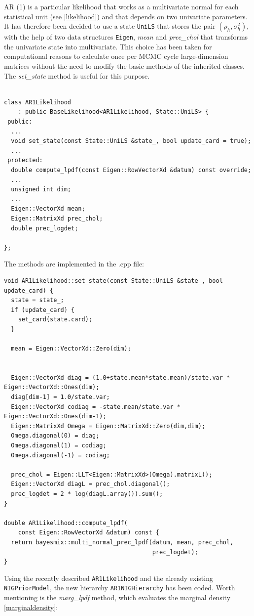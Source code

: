 \documentclass[12pt,a4paper]{article}
\begin{document}
AR (1) is a particular likelihood that works as a multivariate normal for each statistical unit (see \autoref{likelihood}) and that depends on two univariate parameters. It has therefore been decided to use a state \texttt{UniLS} that stores the pair $(\rho_h, \sigma_h^2)$, with the help of two data structures \texttt{Eigen}, \textit{mean} and \textit{prec\_chol} that transforms the univariate state into multivariate. This choice has been taken for computational reasons to calculate once per MCMC cycle large-dimension matrices without the need to modify the basic methods of the inherited classes. The \textit{set\_state} method is useful for this purpose.
\begin{lstlisting} 

class AR1Likelihood
    : public BaseLikelihood<AR1Likelihood, State::UniLS> {
 public:
  ...
  void set_state(const State::UniLS &state_, bool update_card = true);
  ...
 protected:
  double compute_lpdf(const Eigen::RowVectorXd &datum) const override;
  ...
  unsigned int dim;
  ...
  Eigen::VectorXd mean;
  Eigen::MatrixXd prec_chol;
  double prec_logdet;

};
\end{lstlisting}
The methods are implemented in the .cpp file:
\begin{lstlisting}
void AR1Likelihood::set_state(const State::UniLS &state_, bool update_card) {
  state = state_;
  if (update_card) {
    set_card(state.card);
  }

  mean = Eigen::VectorXd::Zero(dim);


  Eigen::VectorXd diag = (1.0+state.mean*state.mean)/state.var * Eigen::VectorXd::Ones(dim);
  diag[dim-1] = 1.0/state.var;
  Eigen::VectorXd codiag = -state.mean/state.var * Eigen::VectorXd::Ones(dim-1);
  Eigen::MatrixXd Omega = Eigen::MatrixXd::Zero(dim,dim);
  Omega.diagonal(0) = diag;
  Omega.diagonal(1) = codiag;
  Omega.diagonal(-1) = codiag;

  prec_chol = Eigen::LLT<Eigen::MatrixXd>(Omega).matrixL();
  Eigen::VectorXd diagL = prec_chol.diagonal();
  prec_logdet = 2 * log(diagL.array()).sum();
}

double AR1Likelihood::compute_lpdf(
    const Eigen::RowVectorXd &datum) const {
  return bayesmix::multi_normal_prec_lpdf(datum, mean, prec_chol,
                                          prec_logdet);
}
\end{lstlisting}

Using the recently described \texttt{AR1Likelihood} and the already existing \texttt{NIGPriorModel}, the new hierarchy \texttt{AR1NIGHierarchy} has been coded. Worth mentioning is the \textit{marg\_lpdf} method, which evaluates the marginal density \autoref{marginaldensity}:
\end{document}
